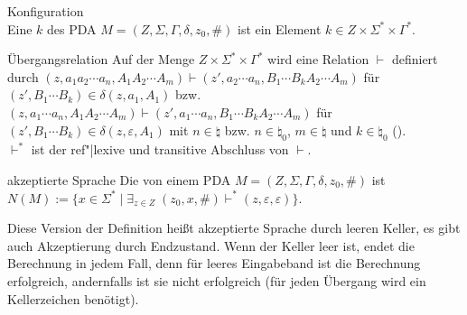 \linie

\begin{Def}{Konfiguration}\\
    Eine  $k$ des PDA
    $M = (Z, \Sigma, \Gamma, \delta, z_0, \#)$
    ist ein Element $k \in Z \times \Sigma^\ast \times \Gamma^\ast$.
\end{Def}

\begin{Def}{Übergangsrelation}
    Auf der Menge $Z \times \Sigma^\ast \times \Gamma^\ast$ wird eine
    Relation $\vdash$ definiert durch
    $(z, a_1 a_2 \dotsb a_n, A_1 A_2 \dotsb A_m) \vdash
    (z', a_2 \dotsb a_n, B_1 \dotsb B_k A_2 \dotsb A_m)$ für
    $(z', B_1 \dotsb B_k) \in \delta(z, a_1, A_1)$ bzw.\!
    $(z, a_1 \dotsb a_n, A_1 A_2 \dotsb A_m) \vdash
    (z', a_1 \dotsb a_n, B_1 \dotsb B_k A_2 \dotsb A_m)$ für
    $(z', B_1 \dotsb B_k) \in \delta(z, \varepsilon, A_1)$
    mit $n \in \natural$ bzw. $n \in \natural_0$,
    $m \in \natural$ und $k \in \natural_0$ ().\\
    $\vdash^\ast$ ist der ref"|lexive und transitive Abschluss von $\vdash$.
\end{Def}

\begin{Def}{akzeptierte Sprache}
    Die von einem PDA $M = (Z, \Sigma, \Gamma, \delta, z_0, \#)$
     ist
    $N(M) := \{x \in \Sigma^\ast \;|\;
    \exists_{z \in Z}\; (z_0, x, \#) \vdash^\ast
    (z, \varepsilon, \varepsilon)\}$.
\end{Def}

\begin{Bem}
    Diese Version der Definition heißt akzeptierte Sprache durch leeren Keller,
    es gibt auch Akzeptierung durch Endzustand.
    Wenn der Keller leer ist, endet die Berechnung in jedem Fall, denn für
    leeres Eingabeband ist die Berechnung erfolgreich, andernfalls ist sie
    nicht erfolgreich (für jeden Übergang wird ein Kellerzeichen benötigt).
\end{Bem}

\linie
\pagebreak

